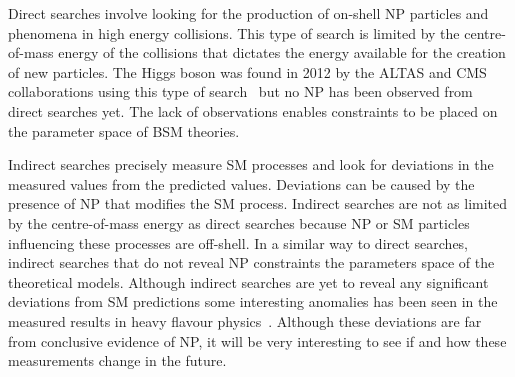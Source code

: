 Direct searches involve looking for the production of on-shell NP particles and phenomena in high energy collisions. 
This type of search is limited by the centre-of-mass energy of the collisions that dictates the energy available for the creation of new particles. 
The Higgs boson was found in 2012 by the ALTAS and CMS collaborations using this type of search~\cite{Chatrchyan:2012xdj,Aad:2012tfa} but no NP has been observed from direct searches yet. The lack of observations enables constraints to be placed on the parameter space of BSM theories.


Indirect searches precisely measure SM processes and look for deviations in the measured values from the predicted values. Deviations can be caused by the presence of NP that modifies the SM process. 
Indirect searches are not as limited by the centre-of-mass energy as direct searches because NP or SM particles influencing these processes are off-shell. %
In a similar way to direct searches, indirect searches that do not reveal NP constraints the parameters space of the theoretical models. Although indirect searches are yet to reveal any significant deviations from SM predictions some interesting anomalies has been seen in the measured results in heavy flavour physics~\cite{PhysRevLett.118.111801,Aaij:2014pli,Aaij:2015yra,Lees:2013uzd,Huschle:2015rga,Lees:2012xj,Aaij:2015oid,Aaij:2015esa,PhysRevLett.113.151601, R_K_star}. %
Although these deviations are far from conclusive evidence of NP, it will be very interesting to see if and how these measurements change in the future.


